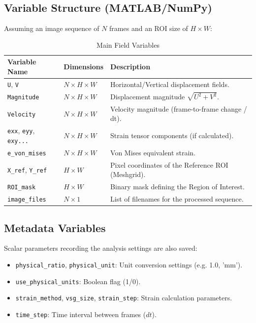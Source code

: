 \documentclass[a4paper,12pt]{article}
\begin{document}
\subsection{Variable Structure (MATLAB/NumPy)}
Assuming an image sequence of $N$ frames and an ROI size of $H \times W$:

\begin{table}[htbp]
\centering
\begin{tabular}{|l|l|l|}
\hline
\textbf{Variable Name} & \textbf{Dimensions} & \textbf{Description} \\ \hline
\texttt{U}, \texttt{V} & $N \times H \times W$ & Horizontal/Vertical displacement fields. \\ \hline
\texttt{Magnitude} & $N \times H \times W$ & Displacement magnitude $\sqrt{U^2 + V^2}$. \\ \hline
\texttt{Velocity} & $N \times H \times W$ & Velocity magnitude (frame-to-frame change / dt). \\ \hline
\texttt{exx}, \texttt{eyy}, \texttt{exy...} & $N \times H \times W$ & Strain tensor components (if calculated). \\ \hline
\texttt{e\_von\_mises} & $N \times H \times W$ & Von Mises equivalent strain. \\ \hline
\texttt{X\_ref}, \texttt{Y\_ref} & $H \times W$ & Pixel coordinates of the Reference ROI (Meshgrid). \\ \hline
\texttt{ROI\_mask} & $H \times W$ & Binary mask defining the Region of Interest. \\ \hline
\texttt{image\_files} & $N \times 1$ & List of filenames for the processed sequence. \\ \hline
\end{tabular}
\caption{Main Field Variables}
\end{table}

\subsection{Metadata Variables}
Scalar parameters recording the analysis settings are also saved:
\begin{itemize}
    \item \texttt{physical\_ratio}, \texttt{physical\_unit}: Unit conversion settings (e.g. 1.0, 'mm').
    \item \texttt{use\_physical\_units}: Boolean flag (1/0).
    \item \texttt{strain\_method}, \texttt{vsg\_size}, \texttt{strain\_step}: Strain calculation parameters.
    \item \texttt{time\_step}: Time interval between frames ($dt$).
\end{itemize}
\end{document}
